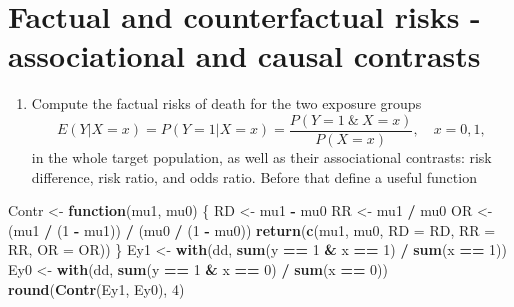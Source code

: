 \documentclass[
]{book}
\newenvironment{Shaded}{\begin{snugshade}}{\end{snugshade}}
\newcommand{\AttributeTok}[1]{\textcolor[rgb]{0.13,0.29,0.53}{#1}}
\newcommand{\ControlFlowTok}[1]{\textcolor[rgb]{0.13,0.29,0.53}{\textbf{#1}}}
\newcommand{\DecValTok}[1]{\textcolor[rgb]{0.00,0.00,0.81}{#1}}
\newcommand{\FunctionTok}[1]{\textcolor[rgb]{0.13,0.29,0.53}{\textbf{#1}}}
\newcommand{\NormalTok}[1]{#1}
\newcommand{\OtherTok}[1]{\textcolor[rgb]{0.56,0.35,0.01}{#1}}
\newcommand{\SpecialCharTok}[1]{\textcolor[rgb]{0.81,0.36,0.00}{\textbf{#1}}}
\providecommand{\tightlist}{%
  \setlength{\itemsep}{0pt}\setlength{\parskip}{0pt}}
\begin{document}
\section{Factual and counterfactual risks - associational and causal contrasts}\label{factual-and-counterfactual-risks---associational-and-causal-contrasts}

\begin{enumerate}
\def\labelenumi{\arabic{enumi}.}
\tightlist
\item
  Compute the factual risks of death for the two exposure groups
  \[ E(Y|X=x) = P(Y=1|X=x) = \frac{P(Y=1\ \&\ X=x)}{P(X=x)},
  \quad x=0,1, \]
  in the whole target population, as well as
  their associational contrasts: risk difference,
  risk ratio, and odds ratio.
  Before that define a useful function
\end{enumerate}

\begin{Shaded}
\begin{Highlighting}[]
\NormalTok{Contr }\OtherTok{\textless{}{-}} \ControlFlowTok{function}\NormalTok{(mu1, mu0) \{}
\NormalTok{  RD }\OtherTok{\textless{}{-}}\NormalTok{ mu1 }\SpecialCharTok{{-}}\NormalTok{ mu0}
\NormalTok{  RR }\OtherTok{\textless{}{-}}\NormalTok{ mu1 }\SpecialCharTok{/}\NormalTok{ mu0}
\NormalTok{  OR }\OtherTok{\textless{}{-}}\NormalTok{ (mu1 }\SpecialCharTok{/}\NormalTok{ (}\DecValTok{1} \SpecialCharTok{{-}}\NormalTok{ mu1)) }\SpecialCharTok{/}\NormalTok{ (mu0 }\SpecialCharTok{/}\NormalTok{ (}\DecValTok{1} \SpecialCharTok{{-}}\NormalTok{ mu0))}
  \FunctionTok{return}\NormalTok{(}\FunctionTok{c}\NormalTok{(mu1, mu0, }\AttributeTok{RD =}\NormalTok{ RD, }\AttributeTok{RR =}\NormalTok{ RR, }\AttributeTok{OR =}\NormalTok{ OR))}
\NormalTok{\}}
\NormalTok{Ey1 }\OtherTok{\textless{}{-}} \FunctionTok{with}\NormalTok{(dd, }\FunctionTok{sum}\NormalTok{(y }\SpecialCharTok{==} \DecValTok{1} \SpecialCharTok{\&}\NormalTok{ x }\SpecialCharTok{==} \DecValTok{1}\NormalTok{) }\SpecialCharTok{/} \FunctionTok{sum}\NormalTok{(x }\SpecialCharTok{==} \DecValTok{1}\NormalTok{))}
\NormalTok{Ey0 }\OtherTok{\textless{}{-}} \FunctionTok{with}\NormalTok{(dd, }\FunctionTok{sum}\NormalTok{(y }\SpecialCharTok{==} \DecValTok{1} \SpecialCharTok{\&}\NormalTok{ x }\SpecialCharTok{==} \DecValTok{0}\NormalTok{) }\SpecialCharTok{/} \FunctionTok{sum}\NormalTok{(x }\SpecialCharTok{==} \DecValTok{0}\NormalTok{))}
\FunctionTok{round}\NormalTok{(}\FunctionTok{Contr}\NormalTok{(Ey1, Ey0), }\DecValTok{4}\NormalTok{)}
\end{Highlighting}
\end{Shaded}
\end{document}
